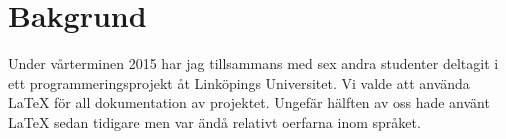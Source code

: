 \section{Bakgrund}
Under vårterminen 2015 har jag tillsammans med sex andra studenter deltagit i ett programmeringsprojekt åt Linköpings Universitet. Vi valde att använda {\LaTeX} för all dokumentation av projektet. Ungefär hälften av oss hade använt {\LaTeX} sedan tidigare men var ändå relativt oerfarna inom språket.    
